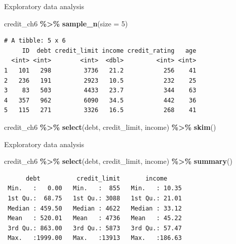 \documentclass[
  ignorenonframetext,
]{beamer}
\newenvironment{Shaded}{\begin{snugshade}}{\end{snugshade}}
\newcommand{\AttributeTok}[1]{\textcolor[rgb]{0.13,0.29,0.53}{#1}}
\newcommand{\DecValTok}[1]{\textcolor[rgb]{0.00,0.00,0.81}{#1}}
\newcommand{\FunctionTok}[1]{\textcolor[rgb]{0.13,0.29,0.53}{\textbf{#1}}}
\newcommand{\NormalTok}[1]{#1}
\newcommand{\SpecialCharTok}[1]{\textcolor[rgb]{0.81,0.36,0.00}{\textbf{#1}}}
\begin{document}
\begin{frame}[fragile]{Exploratory data analysis}
\protect\hypertarget{exploratory-data-analysis-15}{}
\normalsize

\begin{Shaded}
\begin{Highlighting}[]
\NormalTok{credit\_ch6 }\SpecialCharTok{\%\textgreater{}\%} 
  \FunctionTok{sample\_n}\NormalTok{(}\AttributeTok{size =} \DecValTok{5}\NormalTok{)}
\end{Highlighting}
\end{Shaded}

\begin{verbatim}
# A tibble: 5 x 6
     ID  debt credit_limit income credit_rating   age
  <int> <int>        <int>  <dbl>         <int> <int>
1   101   298         3736   21.2           256    41
2   236   191         2923   10.5           232    25
3    83   503         4433   23.7           344    63
4   357   962         6090   34.5           442    36
5   115   271         3326   16.5           268    41
\end{verbatim}

\normalsize

\normalsize

\begin{Shaded}
\begin{Highlighting}[]
\NormalTok{credit\_ch6 }\SpecialCharTok{\%\textgreater{}\%} 
  \FunctionTok{select}\NormalTok{(debt, credit\_limit, income) }\SpecialCharTok{\%\textgreater{}\%} 
  \FunctionTok{skim}\NormalTok{()}
\end{Highlighting}
\end{Shaded}
\end{frame}

\begin{frame}[fragile]{Exploratory data analysis}
\protect\hypertarget{exploratory-data-analysis-16}{}
\normalsize

\begin{Shaded}
\begin{Highlighting}[]
\NormalTok{credit\_ch6 }\SpecialCharTok{\%\textgreater{}\%} 
  \FunctionTok{select}\NormalTok{(debt, credit\_limit, income) }\SpecialCharTok{\%\textgreater{}\%} 
  \FunctionTok{summary}\NormalTok{()}
\end{Highlighting}
\end{Shaded}

\begin{verbatim}
      debt          credit_limit       income      
 Min.   :   0.00   Min.   :  855   Min.   : 10.35  
 1st Qu.:  68.75   1st Qu.: 3088   1st Qu.: 21.01  
 Median : 459.50   Median : 4622   Median : 33.12  
 Mean   : 520.01   Mean   : 4736   Mean   : 45.22  
 3rd Qu.: 863.00   3rd Qu.: 5873   3rd Qu.: 57.47  
 Max.   :1999.00   Max.   :13913   Max.   :186.63  
\end{verbatim}

\normalsize
\end{frame}
\end{document}
